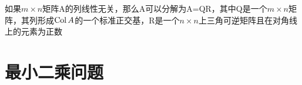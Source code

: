 \begin{TheoremTwo}[QR分解]
如果$m\times n$矩阵A的列线性无关，那么A可以分解为A=QR，其中Q是一个$m\times n$矩阵，其列形成$\operatorname{Col} A$的一个标准正交基，R是一个$n\times n$上三角可逆矩阵且在对角线上的元素为正数
\end{TheoremTwo}\vspace{4ex}

\section{最小二乘问题}

